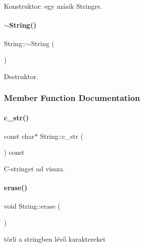 Konstruktor\+: egy másik Stringre. 

\mbox{\label{class_string_ac40b2a3fb58c2d8556f5e6ff73510036}} 
\paragraph{\texorpdfstring{$\sim$String()}{~String()}}
{\footnotesize\ttfamily String\+::$\sim$\+String (\begin{DoxyParamCaption}{ }\end{DoxyParamCaption})\hspace{0.3cm}{\ttfamily [inline]}}



Destruktor. 



\subsubsection{Member Function Documentation}
\mbox{\label{class_string_a0274f3e61533d15086816fb7f47ccb54}} 
\paragraph{\texorpdfstring{c\_str()}{c\_str()}}
{\footnotesize\ttfamily const char$\ast$ String\+::c\+\_\+str (\begin{DoxyParamCaption}{ }\end{DoxyParamCaption}) const\hspace{0.3cm}{\ttfamily [inline]}}



C-\/stringet ad vissza. 

\mbox{\label{class_string_a3ce2ea55be9ec912bb2dbc88d461b479}} 
\paragraph{\texorpdfstring{erase()}{erase()}}
{\footnotesize\ttfamily void String\+::erase (\begin{DoxyParamCaption}{ }\end{DoxyParamCaption})\hspace{0.3cm}{\ttfamily [inline]}}



törli a stringben lévő karaktereket 

